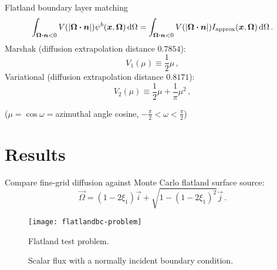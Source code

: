 \documentclass[draft]{beamer}
\begin{document}
\begin{frame}{Flatland boundary layer matching}
\begin{equation*}
\int_{\bm{\Omega}\bm{\cdot}\bm{n} < 0} V( \left| \bm{\Omega}\bm{\cdot}\bm{n} \right|)
\psi^b(\bm{x}, \bm{\Omega}) \mathop{}\!\mathrm{d}\Omega
=
\int_{\bm{\Omega}\bm{\cdot}\bm{n} < 0} V( \left| \bm{\Omega}\bm{\cdot}\bm{n} \right|)
I_\text{approx}(\bm{x}, \bm{\Omega}) \mathop{}\!\mathrm{d}\Omega \,.
\end{equation*}
Marshak (diffusion extrapolation distance $0.7854$):
\begin{equation*}
  V_1(\mu) \equiv \frac{1}{2} \mu \,,
\end{equation*}
Variational (diffusion extrapolation distance $0.8171$):
\begin{equation*}
  V_2(\mu) \equiv \frac{1}{2} \mu + \frac{1}{\pi}\mu^2 \,,
\end{equation*}

($\mu=\cos\omega={}$azimuthal angle cosine, $-\frac{\pi}{2} < \omega <
\frac{\pi}{2}$)
\end{frame}

\section{Results}
\begin{frame}
Compare fine-grid diffusion against Monte Carlo flatland surface source:
\begin{equation*}
  \vec{\Omega} = (1 - 2\xi_1) \vec{i} + \sqrt{1 - (1 - 2\xi_1)^2} \vec{j}\,.
\end{equation*}

\begin{figure}[tb]
  \centering\vspace{-.25in}%
  \texttt{[image: flatlandbc-problem]}
  \vspace{-.25in}

  \caption{Flatland test problem.}
  \label{fig:problem}
\end{figure}

\end{frame}

\begin{frame}
\begin{figure}[tb]
  \centering
  \hspace{-.5in}
  
  \hspace{-.5in}
  \caption{Scalar flux with a normally incident boundary condition.}
  \label{fig:delta}
\end{figure}
\end{frame}
\end{document}
